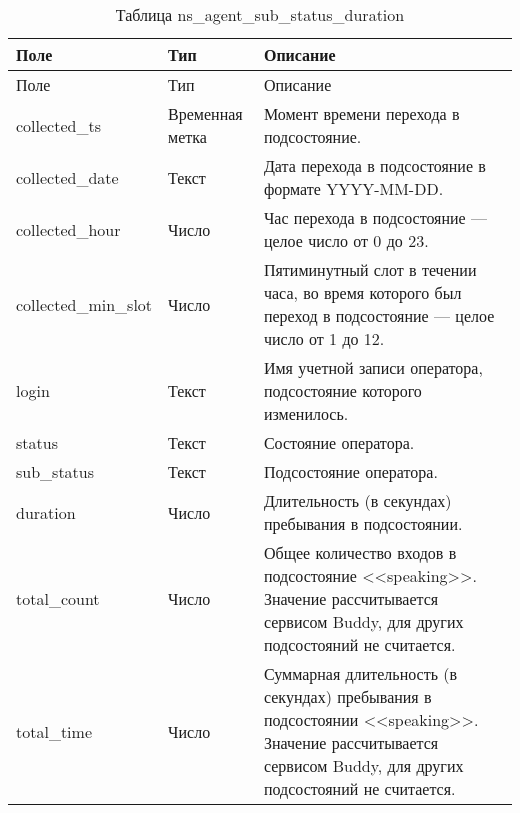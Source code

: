 \begin{small}
    \begin{longtable}{|p{}|p{}|p{}|}
        \caption{Таблица ns\_agent\_sub\_status\_duration}
        \label{tab:db:ns-agent-sub-status-duration}
        \\ \hline
        Поле & Тип & Описание \\
        \hline \endfirsthead
        \hline
        Поле & Тип & Описание \\
        \hline
        \endhead
        \hline \endlastfoot
        collected\_ts &
        Временная метка &
        Момент времени перехода в подсостояние.\\
\hline
        collected\_date &
        Текст &
        Дата перехода в подсостояние в формате YYYY-MM-DD.\\
\hline
        collected\_hour &
        Число &
        Час перехода в подсостояние — целое число от 0 до 23.\\
\hline
        collected\_min\_slot &
        Число &
        Пятиминутный слот в течении часа, во время которого был переход в подсостояние — целое число от 1 до 12.\\
\hline
        login &
        Текст &
        Имя учетной записи оператора, подсостояние которого изменилось.\\
\hline
        status &
        Текст &
        Состояние оператора.\\
\hline
        sub\_status &
        Текст &
        Подсостояние оператора.\\
\hline
        duration &
        Число &
        Длительность (в секундах) пребывания в подсостоянии.\\
\hline
        total\_count &
        Число &
        Общее количество входов в подсостояние <<speaking>>.
        Значение рассчитывается сервисом Buddy, для других подсостояний не считается.\\
\hline
        total\_time &
        Число &
        Суммарная длительность (в секундах) пребывания в подсостоянии <<speaking>>.
        Значение рассчитывается сервисом Buddy, для других подсостояний не считается.\\
    \end{longtable}
\end{small}

